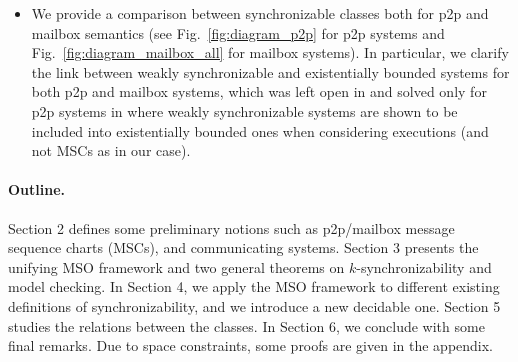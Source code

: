 \documentclass[a4paper,UKenglish,cleveref, autoref, thm-restate]{lipics-v2021}
\begin{document}
\begin{itemize}

%


\item We provide a  comparison between synchronizable classes both for p2p and mailbox semantics (see Fig.~\ref{fig:diagram_p2p} for p2p systems and Fig.~\ref{fig:diagram_mailbox_all} for mailbox systems). In particular, we clarify the link between weakly synchronizable and existentially bounded systems for both p2p and mailbox systems, which was left open in \cite{DBLP:conf/cav/BouajjaniEJQ18} and  solved only for p2p systems in \cite[Theorem 7]{DBLP:journals/corr/abs-1901-09606} where  weakly synchronizable systems are shown to be included into existentially bounded ones when considering executions (and not MSCs as in our case).
\end{itemize}

\paragraph*{Outline.}
Section 2 defines some preliminary notions such as p2p/mailbox message sequence charts (MSCs), and communicating systems. Section 3 presents the unifying MSO framework and two general theorems on $k$-synchro\-nizability and model checking. %
In Section 4, we apply the MSO framework to different existing definitions of synchronizability, and we introduce a new decidable one. Section 5 studies the relations between the classes. In Section 6, we conclude with some final remarks. Due to space constraints, some proofs are given in the appendix.
\end{document}
